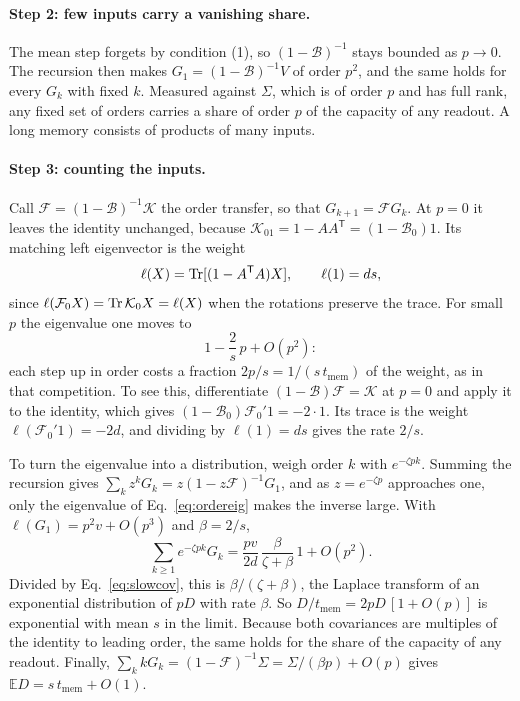 \paragraph{Step 2: few inputs carry a vanishing share.}
The mean step forgets by condition (1), so $(1-\mathcal B)^{-1}$ stays bounded as $p\to0$. The recursion then makes
$G_1=(1-\mathcal B)^{-1}V$ of order $p^2$, and the same holds for every $G_k$ with fixed $k$. Measured against
$\Sigma$, which is of order $p$ and has full rank, any fixed set of orders carries a share of order $p$ of the
capacity of any readout. A long memory consists of products of many
inputs.

\paragraph{Step 3: counting the inputs.}
Call $\mathcal F=(1-\mathcal B)^{-1}\mathcal K$ the order transfer, so that $G_{k+1}=\mathcal FG_k$. At $p=0$ it
leaves the identity unchanged, because $\mathcal K_01=1-AA^{\mathsf T}=(1-\mathcal B_0)1$. Its matching left
eigenvector is the weight
\begin{equation}
  \ell(X)=\operatorname{Tr}[(1-A^{\mathsf T}A)X],\qquad \ell(1)=ds ,
  \label{eq:weight}
\end{equation}
since $\ell(\mathcal F_0X)=\operatorname{Tr}\mathcal K_0X=\ell(X)$ when the rotations preserve the trace. For small $p$ the
eigenvalue one moves to
\begin{equation}
  1-\frac{2}{s}\,p+O(p^2):
  \label{eq:ordereig}
\end{equation}
each step up in order costs a fraction $2p/s=1/(s\,t_{\mathrm{mem}})$ of the weight, as in that competition. To see this,
differentiate $(1-\mathcal B)\mathcal F=\mathcal K$ at $p=0$ and apply it to the identity, which gives
$(1-\mathcal B_0)\mathcal F_0'1=-2\cdot1$. Its trace is the weight $\ell(\mathcal F_0'1)=-2d$, and dividing by
$\ell(1)=ds$ gives the rate $2/s$.

To turn the eigenvalue into a distribution, weigh order $k$ with $e^{-\zeta pk}$. Summing the recursion gives
$\sum_kz^kG_k=z(1-z\mathcal F)^{-1}G_1$, and as $z=e^{-\zeta p}$ approaches one, only the eigenvalue of
Eq.~\eqref{eq:ordereig} makes the inverse large. With $\ell(G_1)=p^2v+O(p^3)$ and $\beta=2/s$,
\begin{equation}
  \sum_{k\ge1}e^{-\zeta pk}G_k=\frac{pv}{2d}\,\frac{\beta}{\zeta+\beta}\,1+O(p^2).
  \label{eq:laplace}
\end{equation}
Divided by Eq.~\eqref{eq:slowcov}, this is $\beta/(\zeta+\beta)$, the Laplace transform of an exponential
distribution of $pD$ with rate $\beta$. So $D/t_{\mathrm{mem}}=2pD\,[1+O(p)]$ is exponential with mean $s$ in the limit. Because both
covariances are multiples of the identity to leading order, the same holds for the share of the capacity of any
readout. Finally, $\sum_kkG_k=(1-\mathcal F)^{-1}\Sigma=\Sigma/(\beta p)+O(p)$ gives
$\mathbb ED=s\,t_{\mathrm{mem}}+O(1)$.

